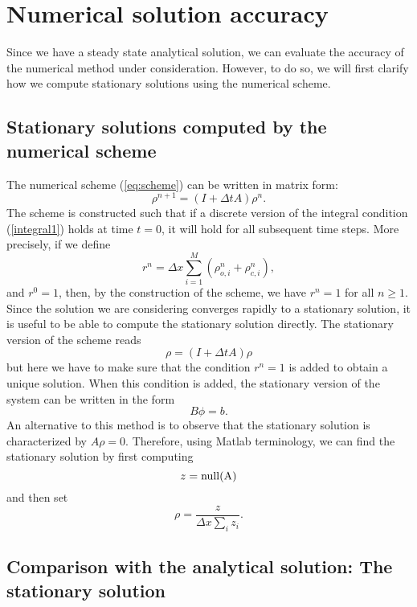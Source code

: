 \section{Numerical solution accuracy}
\label{accuracy}

Since we have a steady state analytical solution, we can 
evaluate the accuracy of the numerical method under consideration.
However, to do so, we will first clarify how we compute stationary 
solutions using the numerical scheme.

\subsection{Stationary solutions computed by the numerical scheme}
 
 
The numerical scheme (\ref{eq:scheme}) can be written in matrix form:
\[
\rho^{n+1}=\left(  I+\Delta tA\right)\rho^{n}.
\]
The scheme is constructed such that if a discrete version of the integral condition (\ref{integral1})
holds at time $t=0$, it will hold for all subsequent time steps. More precisely, if we define
\begin{equation}
r^n=\Delta x\sum_{i=1}^{M}(\rho^n_{o,i}+\rho^n_{c,i}), \label{sum_one}
\end{equation}
and  $r^0=1$, then, by the construction of the scheme, we have $r^n=1$ for all $n\ge 1$.
Since the solution we are considering converges rapidly to a stationary solution, it is useful to be able to compute 
the stationary solution directly. The stationary version of the scheme reads
\[
\rho=\left(  I+\Delta tA\right)\rho 
\]
but here we have to make sure that the condition $r^n=1$ is added to obtain a unique solution. When this condition is added, the stationary version of the system can be written in the form
\[
B\phi=b.
\]
An alternative to this method is to observe that the stationary solution is characterized by $A\rho=0$. Therefore, using Matlab terminology, we can find the stationary solution by first computing 
\[
z=\rm{null}(A)
\]
and then set
\[
\rho=\frac{z}{\Delta x \sum_i z_i}.
\]



\subsection{Comparison with the analytical solution: The stationary solution}

